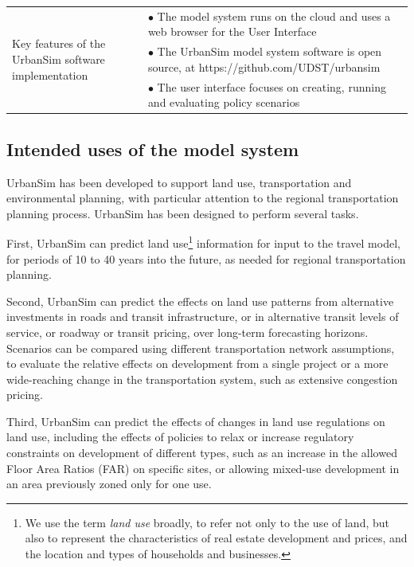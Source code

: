 \begin{table}[htbp]
\begin{center}
\begin{tabular}{ p{} p{} }
    \midrule
    
    \multirow[c]{3}{0.2\textwidth}{Key features of the UrbanSim software implementation}
    & $\bullet$ The model system runs on the cloud and uses a web browser for the User Interface\\
    & $\bullet$ The UrbanSim model system software is open source, at https://github.com/UDST/urbansim\\
    & $\bullet$ The user interface focuses on creating, running and evaluating policy scenarios\\
    
    \bottomrule
\end{tabular}
\end{center}
\end{table}

\subsection{Intended uses of the model system}

UrbanSim has been developed to support land use, transportation and environmental planning, with particular attention to the regional transportation planning process. UrbanSim has been designed to perform several tasks.

First, UrbanSim can predict land use\footnote{We use the term \emph{land use} broadly, to refer not only to the
use of land, but also to represent the characteristics of real estate development and prices, and the location and types of households and businesses.} information for input to the travel model, for periods of 10 to 40 years into the future, as needed for regional transportation planning.

Second, UrbanSim can predict the effects on land use patterns from alternative investments in roads and transit infrastructure, or in alternative transit levels of service, or roadway or transit pricing, over long-term forecasting horizons. Scenarios can be compared using different transportation network assumptions, to evaluate the relative effects on development from a single project or a more wide-reaching change in the transportation system, such as extensive congestion pricing.

Third, UrbanSim can predict the effects of changes in land use regulations on land use, including the effects of policies to relax or increase regulatory constraints on development of different types, such as an increase in the allowed Floor Area Ratios (FAR) on specific sites, or allowing mixed-use development in an area previously zoned only for one use.

